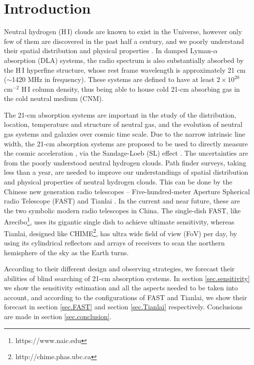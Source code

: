 \documentclass[]{raa}
\newcommand{\HI}{{H{\small\,I}}}
\begin{document}
\section{Introduction}\label{sec.introduction}
Neutral hydrogen (\HI) clouds are known to exist in the Universe,
however only few of them are discovered in the past half a century,
and we poorly understand their spatial distribution and physical
properties \citep{2005ARA&A..43..861W}. 
In damped Lyman-$\alpha$ absorption (DLA)
systems, the radio spectrum is also substantially absorbed by the {\HI}
hyperfine structure, whose rest frame wavelength is approximately 21 cm
($\sim$1420 MHz in frequency). These systems are defined to have
at least $2\times 10^{20}$ cm$^{-2}$ {\HI} column density, thus being
able to house cold 21-cm absorbing gas in the cold neutral medium (CNM).

The 21-cm absorption systems are important in the study of the 
distribution, location, temperature and structure of neutral gas,
and the evolution of neutral gas systems and galaxies over
cosmic time scale.
Due to the narrow intrinsic line width, the 21-cm absorption systems
are proposed to be used to directly measure the cosmic acceleration
\citep{2012ApJ...761L..26D,2014PhRvL.113d1303Y}, via the 
Sandage-Loeb (SL) effect \citep{1962ApJ...136..319S,1998ApJ...499L.111L}.
The uncertainties are from the poorly understood neutral hydrogen
clouds. Path finder surveys, taking less than a year, are needed
to improve our understandings of spatial distribution and physical
properties of neutral hydrogen clouds.
This can be done by the Chinese new generation radio telescopes --
Five-hundred-meter Aperture Spherical radio Telescope (FAST)
\citep{2016RaSc...51.1060L} and
Tianlai \citep{2012IJMPS..12..256C}. In the current and near future,
these are the two symbolic modern radio telescopes in China.
The single-dish FAST, like Arecibo\footnote{https://www.naic.edu},
uses its gigantic single dish to achieve ultimate sensitivity, whereas
Tianlai, designed like CHIME\footnote{http://chime.phas.ubc.ca},
has ultra wide field of view (FoV) per day, by
using its cylindrical reflectors and arrays of receivers to
scan the northern hemisphere of the sky as the Earth turns.

According to their different design and observing strategies,
we forecast their abilities of blind searching of 21-cm absorption
systems. In section \ref{sec.sensitivity} we show the sensitivity
estimation and all the aspects
needed to be taken into account,
and according to the configurations of FAST and Tianlai,
we show their forecast in section \ref{sec.FAST}
and section \ref{sec.Tianlai} respectively.
Conclusions are made in section \ref{sec.conclusion}.
\end{document}
